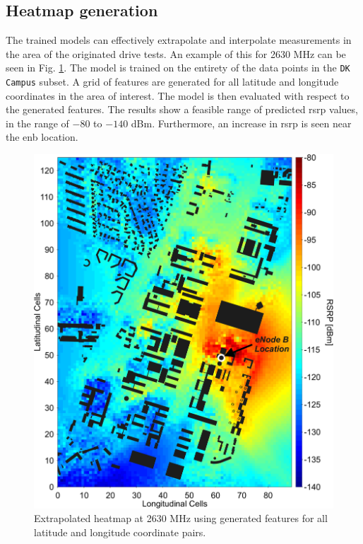 \subsection{Heatmap generation}

The trained models can effectively extrapolate and interpolate measurements in the area of the originated drive tests. An example of this for 2630 MHz can be seen in Fig. \ref{fig:osm_heatmap}. The model is trained on the entirety of the data points in the \texttt{DK Campus} subset. A grid of features are generated for all latitude and longitude coordinates in the area of interest. The model is then evaluated with respect to the generated features. The results show a feasible range of predicted \gls{rsrp} values, in the range of $-80$ to $-140$ dBm. Furthermore, an increase in \gls{rsrp} is seen near the \gls{enb} location. 

\begin{figure}[!h]
    \centering
    \includegraphics{chapters/part_pathloss/osm_images_paper/figures/heatmap.pdf}
    \caption{Extrapolated heatmap at 2630 MHz using generated features for all latitude and longitude coordinate pairs.}
    \label{fig:osm_heatmap}
\end{figure}

